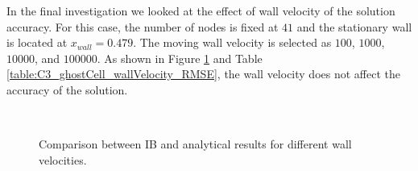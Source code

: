%
In the final investigation we looked at the effect of wall velocity of the solution accuracy. For this case, the number of nodes is fixed at $41$ and the stationary wall is located at $x_{wall} = 0.479$. The moving wall velocity is selected as $100$, $1000$, $10000$, and $100000$. As shown in Figure \ref{fig:C3_ghostCell_wallVelocity} and Table \ref{table:C3_ghostCell_wallVelocity_RMSE}, the wall velocity does not affect the accuracy of the solution.
%
\begin{figure}[H]
    \centering
    \quad
    \\
    \quad
    \caption{Comparison between IB and analytical results for different wall velocities.}
    \label{fig:C3_ghostCell_wallVelocity}
\end{figure}
